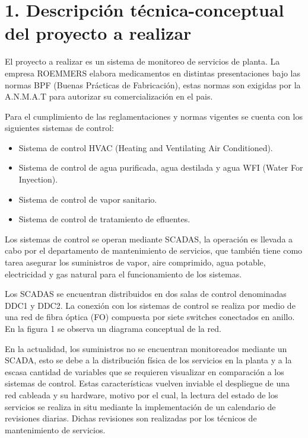 \documentclass[
11pt%
]{charter}
\begin{document}
\section{1. Descripción técnica-conceptual del proyecto a realizar}
\label{sec:descripcion}



El proyecto a realizar es un sistema de monitoreo de servicios de planta. La empresa ROEMMERS elabora medicamentos en distintas presentaciones bajo las normas BPF (Buenas Prácticas de Fabricación), estas normas son exigidas por la A.N.M.A.T para autorizar su comercialización en el pais. %

Para el cumplimiento de las reglamentaciones y normas vigentes se cuenta con los siguientes sistemas de control:
\begin{itemize}
	\item Sistema de control HVAC (Heating and Ventilating Air Conditioned).
	\item Sistema de control de agua purificada, agua destilada y agua WFI (Water For Inyection).
	\item Sistema de control de vapor sanitario.
	\item Sistema de control de tratamiento de efluentes.
\end{itemize}

Los sistemas de control se operan mediante SCADAS, la operación es llevada a cabo por el departamento de mantenimiento de servicios, que también tiene como tarea asegurar los suministros de vapor, aire comprimido, agua potable, electricidad y gas natural para el funcionamiento de los sistemas.

Los SCADAS se encuentran distribuidos en dos salas de control denominadas DDC1 y DDC2. La conexión con los sistemas de control se realiza por medio de una red de fibra óptica (FO) compuesta por siete switches conectados en anillo. En la figura 1 se observa un diagrama conceptual de la red. 

En la actualidad, los suministros no se encuentran monitoreados mediante un SCADA, esto se debe a la distribución física de los servicios en la planta y a la escasa cantidad de variables que se requieren visualizar en comparación a los sistemas de control. Estas características vuelven inviable el despliegue de una red cableada y su hardware, motivo por el cual, la lectura del estado de los servicios se realiza in situ mediante la implementación de un calendario de revisiones diarias. Dichas revisiones son realizadas por los técnicos de mantenimiento de servicios.
\end{document}
